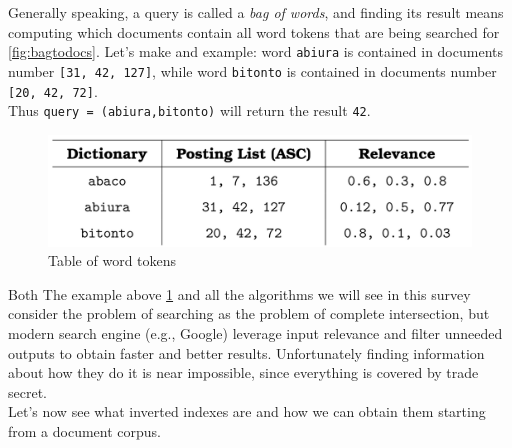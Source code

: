 Generally speaking, a query is called a \textit{bag of words}, and finding its result means computing which documents contain all word tokens that are being searched for \ref{fig:bagtodocs}. Let's make and example: word \verb+abiura+ is contained in documents number \verb+[31, 42, 127]+, while word \verb+bitonto+ is contained in documents number \verb+[20, 42, 72]+. \\
Thus \verb|query = (abiura,bitonto)| will return the result \verb+42+. \\

\begin{figure}[ht] 
\begin{center}
\includegraphics[width=.8\textwidth]{imgs/table_of_words.png}
\caption{Table of word tokens\label{fig:table_wtokens}}
\end{center}
\end{figure}

Both The example above \ref{fig:table_wtokens} and all the algorithms we will see in this survey consider the problem of searching as the problem of complete intersection, but modern search engine (e.g., Google)  leverage input relevance and filter unneeded outputs to obtain faster and better results. Unfortunately finding information about how they do it is near impossible, since everything is covered by trade secret. \\
Let's now see what inverted indexes are and how we can obtain them starting from a document corpus.

